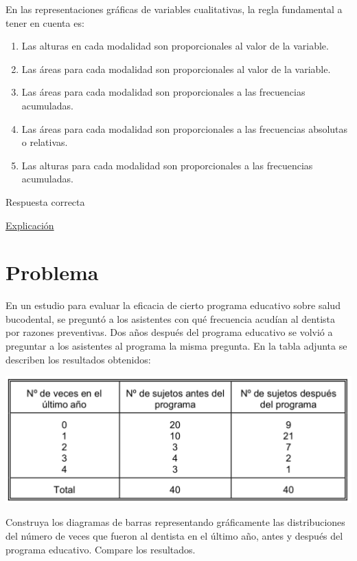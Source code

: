 \documentclass[
]{book}
\providecommand{\tightlist}{%
  \setlength{\itemsep}{0pt}\setlength{\parskip}{0pt}}
\begin{document}
En las representaciones gráficas de variables cualitativas, la regla fundamental a tener en cuenta es:

\begin{enumerate}
\def\labelenumi{\alph{enumi})}
\tightlist
\item
  Las alturas en cada modalidad son proporcionales al valor de la variable.
\item
  Las áreas para cada modalidad son proporcionales al valor de la variable.
\item
  Las áreas para cada modalidad son proporcionales a las frecuencias acumuladas.
\item
  Las áreas para cada modalidad son proporcionales a las frecuencias absolutas o relativas.
\item
  Las alturas para cada modalidad son proporcionales a las frecuencias acumuladas.
\end{enumerate}

Respuesta correcta

\href{https://1fjmanzano.github.io/bioestadistica/diagramas-de-barras-y-sectores.html}{Explicación}

\hypertarget{problema-6}{%
\section{Problema}\label{problema-6}}

En un estudio para evaluar la eficacia de cierto programa educativo sobre salud bucodental, se preguntó a los asistentes con qué frecuencia acudían al dentista por razones preventivas. Dos años después del programa educativo se volvió a preguntar a los asistentes al programa la misma pregunta. En la tabla adjunta se describen los resultados obtenidos:

\includegraphics[width=16.06in]{img/2_2}

Construya los diagramas de barras representando gráficamente las distribuciones del número de veces que fueron al dentista en el último año, antes y después del programa educativo. Compare los resultados.
\end{document}
